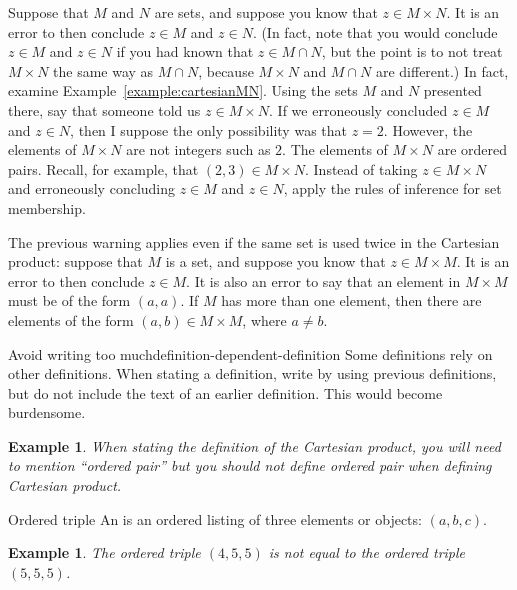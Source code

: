 \documentclass{book}
\newcounter{ekcounter}%
\theoremstyle{ekimcustom}
\newtheorem{example}[ekcounter]{Example}
\newcommand\defn[1]{{\color{blue}{\bf #1}}}
\begin{document}
\begin{bwarning}{}{}
Suppose that $M$ and $N$ are sets, and suppose you know that $z \in M \times N$. It is an error to then conclude $z \in M$ and $z \in N$. (In fact, note that you would conclude $z \in M$ and $z \in N$ if you had known that $z \in M \cap N$, but the point is to not treat $M \times N$ the same way as $M \cap N$, because $M \times N$ and $M \cap N$ are different.)
\vskip6pt
In fact, examine Example~\ref{example:cartesianMN}. Using the sets $M$ and $N$ presented there, say that someone told us $z \in M \times N$. If we erroneously concluded $z \in M$ and $z \in N$, then I suppose the only possibility was that $z = 2$. However, the elements of $M \times N$ are not integers such as $2$. The elements of $M \times N$ are ordered pairs. Recall, for example, that $(2,3) \in M \times N$.
\vskip6pt
Instead of taking $z \in M \times N$ and erroneously concluding $z \in M$ and $z \in N$, apply the rules of inference for set membership.
\end{bwarning}

\begin{bwarning}{}{}
The previous warning applies even if the same set is used twice in the Cartesian product: suppose that $M$ is a set, and suppose you know that $z \in M \times M$. It is an error to then conclude $z \in M$. It is also an error to say that an element in $M \times M$ must be of the form $(a,a)$. If $M$ has more than one element, then there are elements of the form $(a,b) \in M \times M$, where $a \not= b$.
\end{bwarning}

\begin{bwarning}{Avoid writing too much}{definition-dependent-definition}
Some definitions rely on other definitions. When stating a definition, write by using previous definitions, but do not include the text of an earlier definition. This would become burdensome.
\end{bwarning}
\begin{example}
When stating the definition of the Cartesian product, you will need to mention ``ordered pair'' but you should not \emph{define} ordered pair when defining Cartesian product.
\end{example}

\begin{bdefinition}{Ordered triple}{}
An \defn{ordered triple} is an ordered listing of three elements or objects: $(a,b,c)$.
\end{bdefinition}
\begin{example}
The ordered triple $(4,5,5)$ is not equal to the ordered triple $(5,5,5)$.
\end{example}
\end{document}
